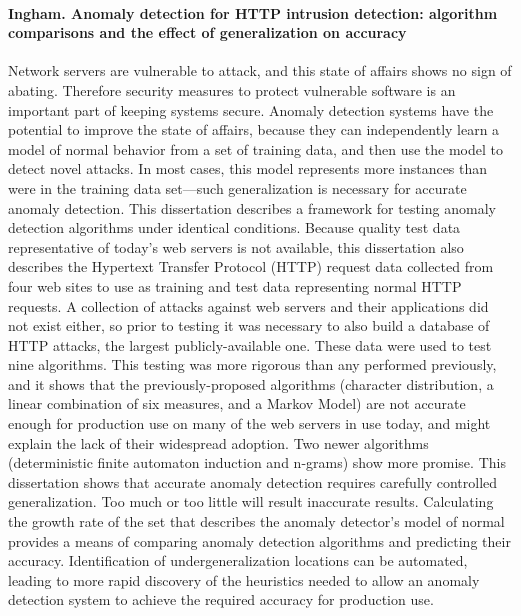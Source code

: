 \paragraph*{Ingham. Anomaly detection for HTTP intrusion detection: algorithm comparisons and the effect of generalization on accuracy}
\cite{ingham2007anomaly}
Network servers are vulnerable to attack, and this state of affairs shows no sign of abating. Therefore security measures to protect vulnerable software is an important part of keeping systems secure. Anomaly detection systems have the potential to improve the state of affairs, because they can independently learn a model of normal behavior from a set of training data, and then use the model to detect novel attacks. In most cases, this model represents more instances than were in the training data set—such generalization is necessary for accurate anomaly detection.
 This dissertation describes a framework for testing anomaly detection algorithms under identical conditions. Because quality test data representative of today’s web servers is not available, this dissertation also describes the Hypertext Transfer Protocol (HTTP) request data collected from four web sites to use as training and test data representing normal HTTP requests. A collection of attacks against web servers and their applications did not exist either, so prior to testing it was necessary to also build a database of HTTP attacks, the largest publicly-available one.
  These data were used to test nine algorithms. This testing was more rigorous than any performed previously, and it shows that the previously-proposed algorithms (character distribution, a linear combination of six measures, and a Markov Model) are not accurate enough for production use on many of the web servers in use today, and might explain the lack of their widespread adoption. Two newer algorithms (deterministic finite automaton induction and n-grams) show more promise.
  This dissertation shows that accurate anomaly detection requires carefully controlled generalization. Too much or too little will result inaccurate results. Calculating the growth rate of the set that describes the anomaly detector’s model of normal provides a means of comparing anomaly detection algorithms and predicting their accuracy. Identification of undergeneralization locations can be automated, leading to more rapid discovery of the heuristics needed to allow an anomaly detection system to achieve the required accuracy for production use.

